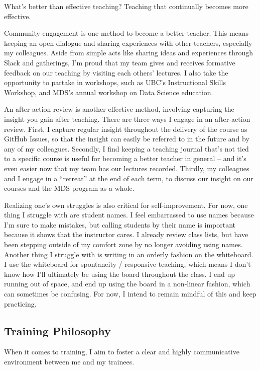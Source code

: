 \documentclass[]{article}
\begin{document}
What's better than effective teaching? Teaching that continually becomes more effective.

Community engagement is one method to become a better teacher. This means keeping an open dialogue and sharing experiences with other teachers, especially my colleagues. Aside from simple acts like sharing ideas and experiences through Slack and gatherings, I'm proud that my team gives and receives formative feedback on our teaching by visiting each others' lectures. I also take the opportunity to partake in workshops, such as UBC's Instructional Skills Workshop, and MDS's annual workshop on Data Science education.

An after-action review is another effective method, involving capturing the insight you gain after teaching. There are three ways I engage in an after-action review. First, I capture regular insight throughout the delivery of the course as GitHub Issues, so that the insight can easily be referred to in the future and by any of my colleagues. Secondly, I find keeping a teaching journal that's not tied to a specific course is useful for becoming a better teacher in general -- and it's even easier now that my team has our lectures recorded. Thirdly, my colleagues and I engage in a ``retreat'' at the end of each term, to discuss our insight on our courses and the MDS program as a whole.

Realizing one's own struggles is also critical for self-improvement. For now, one thing I struggle with are student names. I feel embarrassed to use names because I'm sure to make mistakes, but calling students by their name is important because it shows that the instructor cares. I already review class lists, but have been stepping outside of my comfort zone by no longer avoiding using names. Another thing I struggle with is writing in an orderly fashion on the whiteboard. I use the whiteboard for spontaneity / responsive teaching, which means I don't know how I'll ultimately be using the board throughout the class. I end up running out of space, and end up using the board in a non-linear fashion, which can sometimes be confusing. For now, I intend to remain mindful of this and keep practicing.

\hypertarget{training-philosophy}{%
\subsection{Training Philosophy}\label{training-philosophy}}

When it comes to training, I aim to foster a clear and highly communicative environment between me and my trainees.
\end{document}

